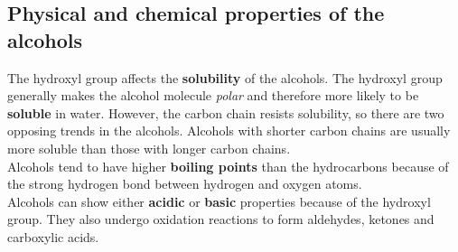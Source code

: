 
\subsection{Physical and chemical properties of the alcohols}
\label{sec:om:physchem}

The hydroxyl group affects the \textbf{solubility} of the alcohols. The hydroxyl group generally makes the alcohol molecule \textit{polar} and therefore more likely to be \textbf{soluble} in water. However, the carbon chain resists solubility, so there are two opposing trends in the alcohols. Alcohols with shorter carbon chains are usually more soluble than those with longer carbon chains.\\

Alcohols tend to have higher \textbf{boiling points} than the hydrocarbons because of the strong hydrogen bond between hydrogen and oxygen atoms. \\

Alcohols can show either \textbf{acidic} or \textbf{basic} properties because of the hydroxyl group. They also undergo oxidation reactions to form aldehydes, ketones and carboxylic acids.


